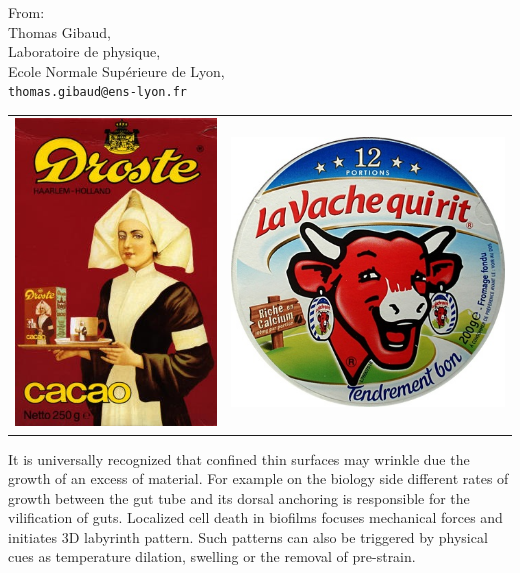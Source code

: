 \documentclass[a4paper, parskip=true, firsthead=false, fromemail=true, foldmarks=false]{scrlttr2}
\begin{document}
\begin{letter}{From:\\
Thomas Gibaud,\\
Laboratoire de physique,\\
Ecole Normale Supérieure de Lyon,\\
\texttt{thomas.gibaud@ens-lyon.fr}
}
\begin{tabu}{X[c]X[c]}
\includegraphics[height=6\baselineskip]{../Droste.jpg}&
\includegraphics[height=6\baselineskip]{../vachequirit.jpg}
\end{tabu}



It is universally recognized that confined thin surfaces may wrinkle due the growth of an excess of material. For example on the biology side different rates of growth between the gut tube and its dorsal anchoring is responsible for the vilification of guts. Localized cell death in biofilms focuses mechanical forces and initiates 3D labyrinth pattern. Such patterns can also be triggered by physical cues as temperature dilation, swelling or the removal of pre-strain.


\end{letter}
\end{document}
